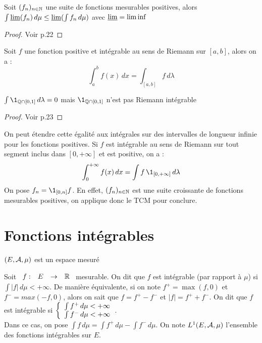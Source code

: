 \documentclass[]{report}
\begin{document}
\begin{tm}
    Soit $(f_n)_{n\in\mathbb{N}}$ une suite de fonctions mesurables positives, alors $\int \underline{\lim}(f_n)\,d\mu\le\underline{\lim}(\int f_n\,d\mu)$ avec $\underline{\lim}=\liminf$
\end{tm}

\begin{proof}
    Voir p.22
\end{proof}

\begin{tm}
    Soit $f$ une fonction positive et intégrable au sens de Riemann sur $[a,b]$, alors on a : 
    \[\int_a^b f(x)\,dx=\int_{[a,b]}f\,d\lambda\]
\end{tm}

\begin{ex}
    $\int\1_{\Q\cap[0,1]}\,d\lambda=0$ mais $\1_{\Q\cap[0,1]}$ n'est pas Riemann intégrable
\end{ex}

\begin{proof}
    Voir p.23
\end{proof}

\begin{re}
    On peut étendre cette égalité aux intégrales sur des intervalles de longueur infinie pour les fonctions positives. Si $f$ est intégrable au sens de Riemann sur tout segment inclus dans $[0,+\infty]$ et est positive, on a : $$\int_0^{+\infty}f(x)\,dx=\int f\,\1_{[0,+\infty]}\,d\lambda$$
    On pose $f_n=\1_{[0,n]}f$. En effet, $(f_n)_{n\in\mathbb{N}}$ est une suite croissante de fonctions mesurables positives, on applique donc le TCM pour conclure.
\end{re}

\section{Fonctions intégrables}

$(E,\mathcal{A},\mu)$ est un espace mesuré

\begin{df}
    Soit $\begin{array}{ccccc} f : & E & \to & \mathbb{R} \end{array}$ mesurable. On dit que $f$ est intégrable (par rapport à $\mu$) si $\int |f|\,d\mu<+\infty$. 
    De manière équivalente, si on note $f^+=\max(f,0)$ et $f^-=max(-f,0)$, alors on sait que $f=f^+-f^-$ et $|f|=f^++f^-$. On dit que $f$ est intégrable si $\left\{\begin{array}{ll} \int f^+\,d\mu<+\infty\\
    \int f^-\,d\mu<+\infty \end{array} \right.$.\\
    Dans ce cas, on pose $\int f\,d\mu=\int f^+\,d\mu-\int f^-\,d\mu$. On note $L^1(E,\mathcal{A},\mu)$ l'ensemble des fonctions intégrables sur $E$.
\end{df}
\end{document}
